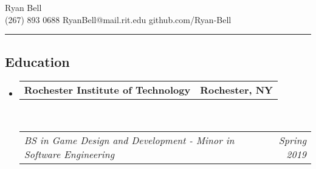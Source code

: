\documentclass[10pt, letterpaper]{article}
\makeatletter
\newcommand{\headerrow}[2]
{\begin{tabular*}{\linewidth}{l@{\extracolsep{\fill}}r}
	#1 &
	#2 \\
\end{tabular*}}
\makeatother
\begin{document}
\begin{center}
Ryan Bell
\\
(267) 893 0688 \textbullet RyanBell@mail.rit.edu \textbullet github.com/Ryan-Bell
\end{center}

\hrule

\subsection*{Education}
\begin{itemize}
	\parskip=0.1em
	\item
	\headerrow
		{\textbf{Rochester Institute of Technology}}
		{\textbf{Rochester, NY}}
	\\
	\headerrow
		{\emph{BS in Game Design and Development - Minor in Software Engineering}}
		{\emph{Spring 2019}}
\end{itemize}
\end{document}

